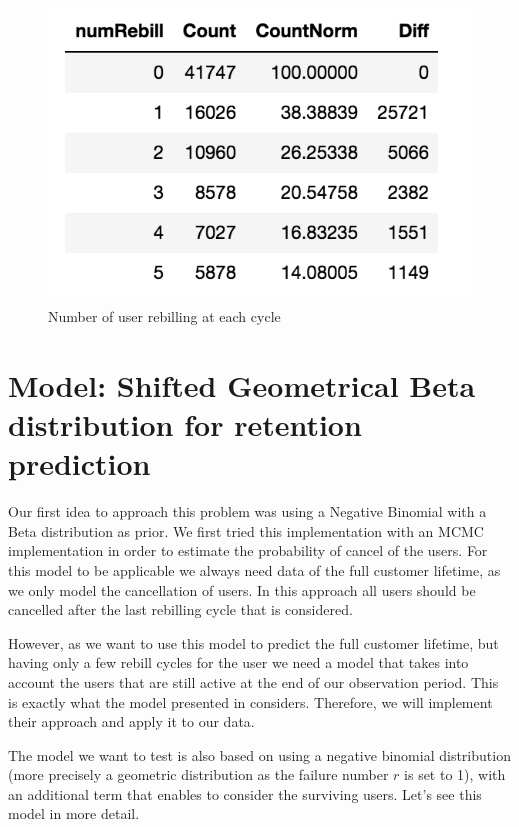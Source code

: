 \documentclass[paper=a4, fontsize=11pt]{scrartcl} %
\numberwithin{equation}{section} %
\numberwithin{figure}{section} %
\numberwithin{table}{section} %
\begin{document}
 \begin{figure}[h!]
 	\centering
  \includegraphics[scale = 0.55]{Data_sample.png}
  \caption{Number of user rebilling at each cycle}
  \label{fig:Data_sample}
\end{figure}

\section{Model: Shifted Geometrical Beta distribution for retention prediction}
 
 Our first idea to approach this problem was using a Negative Binomial with a Beta distribution as prior. We first tried this implementation with an MCMC implementation in order to estimate the probability of cancel of the users. For this model to be applicable we always need data of the full customer lifetime, as we only model the cancellation of users. In this approach all users should be cancelled after the last rebilling cycle that is considered.
 
 However, as we want to use this model to predict the full customer lifetime, but having only a few rebill cycles for the user we need a model that takes into account the users that are still active at the end of our observation period. This is exactly what the model presented in \cite{feder07} considers. Therefore, we will implement their approach and apply it to our data.
 
 The model we want to test is also based on using a negative binomial distribution (more precisely a geometric distribution as the failure number $r$ is set to 1), with an additional term that enables to consider the surviving users. Let's see this model in more detail. 
 
\end{document}
